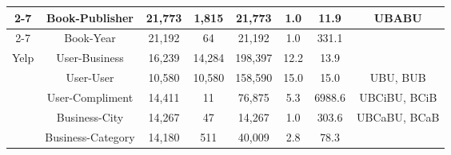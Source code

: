 \begin{table*}[t]
{\begin{tabular}{|c||c|c|c|c|c|c|c|}
\cline{2-7}
\multirow{5}{*}{} & {Book-Publisher} & {21,773} & {1,815} & {21,773} & {1.0} & {11.9} & \multirow{2}{*}{UBABU} \\
\cline{2-7}
\multirow{5}{*}{} & {Book-Year} & {21,192} & {64} & {21,192} & {1.0} & {331.1} & \multirow{2}{*}{} \\
\hline
\hline
\multirow{5}{*}{Yelp} & {User-Business} & {16,239} & {14,284} & {198,397} & {12.2} & {13.9} &{} \\
\cline{2-7}
\multirow{5}{*}{(0.08\%)} & {User-User} & {10,580} & {10,580} & {158,590} & {15.0} & {15.0} &{UBU, BUB} \\
\cline{2-7}
\multirow{5}{*}{} & {User-Compliment} & {14,411} & {11} & {76,875} & {5.3} & {6988.6} & {UBCiBU, BCiB} \\
\cline{2-7}
\multirow{5}{*}{} & {Business-City} & {14,267} & {47} & {14,267} & {1.0} & {303.6} & {UBCaBU, BCaB} \\
\cline{2-7}
\multirow{5}{*}{} & {Business-Category} & {14,180} & {511} & {40,009} & {2.8} & {78.3} & {} \\
\hline

\end{tabular}}
\end{table*}



